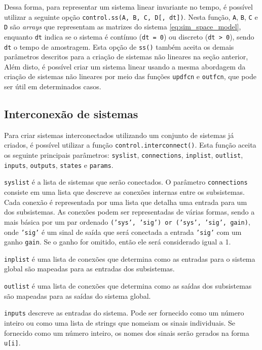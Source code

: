 Dessa forma, para representar um sistema linear invariante no tempo, é possível utilizar a seguinte opção \texttt{control.ss(A, B, C, D[, dt])}. Nesta função, \texttt{A}, \texttt{B}, \texttt{C} e \texttt{D} são \textit{\textit{array}s} que representam as matrizes do sistema \eqref{eq:sim_space_model}, enquanto \texttt{dt} indica se o sistema é contínuo (\texttt{dt = 0}) ou discreto (\texttt{dt > 0}), sendo \texttt{dt} o tempo de amostragem. Esta opção de \texttt{ss()} também aceita os demais parâmetros descritos para a criação de sistemas não lineares na seção anterior, Além disto, é possível criar um sistema linear usando a mesma abordagem da criação de sistemas não lineares por meio das funções \texttt{updfcn} e \texttt{outfcn}, que pode ser útil em determinados casos.

\subsection{Interconexão de sistemas}

Para criar sistemas interconectados utilizando um conjunto de sistemas já criados, é possível utilizar a função \texttt{control.interconnect()}. Esta função aceita os seguinte principais parâmetros: \texttt{syslist}, \texttt{connections}, \texttt{inplist}, \texttt{outlist}, \texttt{inputs}, \texttt{outputs},  \texttt{states} e \texttt{params}.

\texttt{syslist} é a lista de sistemas que serão conectados. O parâmetro \texttt{connections} consiste em uma lista que descreve as conexões internas entre os subsistemas. Cada conexão é representada por uma lista que detalha uma entrada para um dos subsistemas. As conexões podem ser representadas de várias formas, sendo a mais básica por um par ordenado \texttt{('sys', 'sig') or ('sys', 'sig', gain)}, onde \texttt{'sig'} é um sinal de saída que será conectada a entrada \texttt{'sig'} com um ganho \texttt{gain}. Se o ganho for omitido, então ele será considerado igual a 1.

\texttt{inplist} é uma lista de conexões que determina como as entradas para o sistema global são mapeadas para as entradas dos subsistemas. 

\texttt{outlist} é uma lista de conexões que determina como as saídas dos subsistemas são mapeadas para as saídas do sistema global.

\texttt{inputs} descreve as entradas do sistema. Pode ser fornecido como um número inteiro ou como uma lista de strings que nomeiam os sinais individuais. Se fornecido como um número inteiro, os nomes dos sinais serão gerados na forma \texttt{u[i]}.

